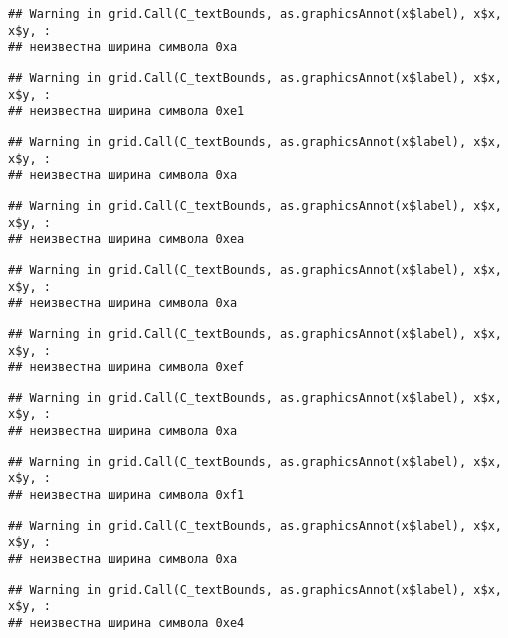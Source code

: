 \documentclass[
]{article}
\begin{document}
\begin{verbatim}
## Warning in grid.Call(C_textBounds, as.graphicsAnnot(x$label), x$x, x$y, :
## неизвестна ширина символа 0xa
\end{verbatim}

\begin{verbatim}
## Warning in grid.Call(C_textBounds, as.graphicsAnnot(x$label), x$x, x$y, :
## неизвестна ширина символа 0xe1
\end{verbatim}

\begin{verbatim}
## Warning in grid.Call(C_textBounds, as.graphicsAnnot(x$label), x$x, x$y, :
## неизвестна ширина символа 0xa
\end{verbatim}

\begin{verbatim}
## Warning in grid.Call(C_textBounds, as.graphicsAnnot(x$label), x$x, x$y, :
## неизвестна ширина символа 0xea
\end{verbatim}

\begin{verbatim}
## Warning in grid.Call(C_textBounds, as.graphicsAnnot(x$label), x$x, x$y, :
## неизвестна ширина символа 0xa
\end{verbatim}

\begin{verbatim}
## Warning in grid.Call(C_textBounds, as.graphicsAnnot(x$label), x$x, x$y, :
## неизвестна ширина символа 0xef
\end{verbatim}

\begin{verbatim}
## Warning in grid.Call(C_textBounds, as.graphicsAnnot(x$label), x$x, x$y, :
## неизвестна ширина символа 0xa
\end{verbatim}

\begin{verbatim}
## Warning in grid.Call(C_textBounds, as.graphicsAnnot(x$label), x$x, x$y, :
## неизвестна ширина символа 0xf1
\end{verbatim}

\begin{verbatim}
## Warning in grid.Call(C_textBounds, as.graphicsAnnot(x$label), x$x, x$y, :
## неизвестна ширина символа 0xa
\end{verbatim}

\begin{verbatim}
## Warning in grid.Call(C_textBounds, as.graphicsAnnot(x$label), x$x, x$y, :
## неизвестна ширина символа 0xe4
\end{verbatim}
\end{document}
